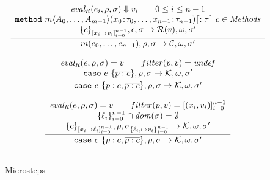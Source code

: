 \begin{figure}
  $$
    \begin{array}{c}
      \cfrac{
      \begin{array}{c}
        {\mathit{eval_R}}(e_i,\rho,\sigma) \Downarrow v_i \qquad 0\leq i \leq n-1                                                                                 \\
        {\tt{method}}~m\langle A_0,\ldots,A_{m-1}\rangle(x_0\!:\!\tau_0,\ldots,x_{n-1}\!:\!\tau_{n-1})\lceil :\tau\rceil~c \in {\mathit{Methods}} \\
        \{c\}_{[x_i \mapsto v_i]_{i=0}^{n-1}},\epsilon, \sigma \rightarrow {\mathcal{R}}(v), \omega, \sigma'
      \end{array}
      }{
      m(e_0,\ldots,e_{n-1}), \rho, \sigma \rightarrow {\mathcal{C}}, \omega, \sigma'
      }
      \\\\
      \cfrac{
        \begin{array}{c}
          {\mathit{eval_R}}(e,\rho,\sigma) = v \qquad
          filter(p,v) = {\mathit{undef}} \\
          {\tt{case}}~e~\{\overline{p:c}\}, \rho ,\sigma \rightarrow \mathcal{K},\omega, \sigma'
        \end{array}
      }{
        {\tt{case}}~e~\{p:c,\overline{p:c}\}, \rho ,\sigma \rightarrow \mathcal{K},\omega, \sigma'
      }
      \\\\
      \cfrac{
        \begin{array}{c}
          {\mathit{eval_R}}(e,\rho,\sigma) = v \qquad
          filter(p,v) = [(x_i,v_i)]_{i=0}^{n-1}              \\
          \{\ell_i\}_{i=0}^{n-1} \cap {\mathit{dom}}(\sigma)= \emptyset \\
          \{c\}_{[x_i \mapsto \ell_i]_{i=0}^{n-1}}, \rho, \sigma_{\{\ell_i, \mapsto v_i\}_{i=0}^{n-1}}
          \rightarrow \mathcal{K},\omega,\sigma'
        \end{array}
      }{
        {\tt{case}}~e~\{p:c,\overline{p:c}\}, \rho ,\sigma \rightarrow \mathcal{K}, \omega , \sigma'
      }
      \\\\
    \end{array}
  $$
  \caption{Microsteps}
  \label{fig:sem2}
\end{figure}
